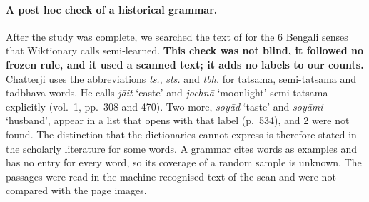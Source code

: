 \documentclass[11pt]{article}
\newcommand{\gl}[1]{`#1'}
\begin{document}
\paragraph{A post hoc check of a historical grammar.} After the study was complete, we searched the text of \citet{chatterji1926} for the 6 Bengali senses that Wiktionary calls semi-learned. \textbf{This check was not blind, it followed no frozen rule, and it used a scanned text; it adds no labels to our counts.} Chatterji uses the abbreviations \textit{ts.}, \textit{sts.} and \textit{tbh.} for tatsama, semi-tatsama and tadbhava words. He calls \textit{j\=ait} \gl{caste} and \textit{jochn\=a} \gl{moonlight} semi-tatsama explicitly (vol.~1, pp.~308 and 470). Two more, \textit{soy\=ad} \gl{taste} and \textit{soy\=ami} \gl{husband}, appear in a list that opens with that label (p.~534), and 2 were not found. The distinction that the dictionaries cannot express is therefore stated in the scholarly literature for some words. A grammar cites words as examples and has no entry for every word, so its coverage of a random sample is unknown. The passages were read in the machine-recognised text of the scan and were not compared with the page images.
\end{document}
